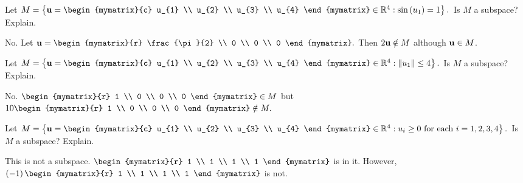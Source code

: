 \begin{enumialphparenastyle}
\begin{ex} Let $M=\left\{ \vect{u}=\begin{mymatrix}{c}
u_{1} \\
u_{2} \\
u_{3} \\
u_{4}
\end{mymatrix} \in 
\R^{4}:\sin \left( u_{1}\right) =1\right\} .$ Is $M$ a subspace?
Explain.
\begin{sol}
No. Let $\vect{u}=\begin{mymatrix}{r}
\frac{\pi }{2} \\
0 \\
0 \\
0
\end{mymatrix} .$ Then $2{\bf u}\notin M$ although ${\bf u}\in M$.
\end{sol}
\end{ex}

\begin{ex} Let $M=\left\{ \vect{u}=\begin{mymatrix}{c}
u_{1} \\
u_{2} \\
u_{3} \\
u_{4}
\end{mymatrix} \in 
\R^{4}:\vectlength u_{1}\vectlength \leq 4\right\} .$ Is $M$ a
subspace? Explain.
\begin{sol}
No. $\begin{mymatrix}{r}
1 \\
0 \\
0 \\
0
\end{mymatrix} \in M$ but $10\begin{mymatrix}{r}
1 \\
0 \\
0 \\
0
\end{mymatrix} \notin M.$
\end{sol}
\end{ex}

\begin{ex} Let $M=\left\{ \vect{u}=\begin{mymatrix}{c}
u_{1} \\
u_{2} \\
u_{3} \\
u_{4}
\end{mymatrix} \in 
\R^{4}:u_{i}\geq 0\text{ for each }i=1,2,3,4\right\} .$ Is $M$ a
subspace? Explain.
\begin{sol}
This is not a subspace. $\begin{mymatrix}{r}
1 \\
1 \\
1 \\
1
\end{mymatrix} $
is in it. However, $\left( -1\right) \begin{mymatrix}{r}
1 \\
1 \\
1 \\
1
\end{mymatrix} $ is not.
\end{sol}
\end{ex}


\end{enumialphparenastyle}
